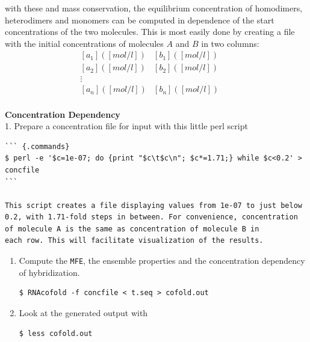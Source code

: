 \documentclass[]{article}
\providecommand{\tightlist}{%
  \setlength{\itemsep}{0pt}\setlength{\parskip}{0pt}}
\begin{document}
with these and mass conservation, the equilibrium concentration of
homodimers, heterodimers and monomers can be computed in dependence of
the start concentrations of the two molecules. This is most easily done
by creating a file with the initial concentrations of molecules \(A\) and
\(B\) in two columns:\\
 \[\begin{array}{llll}
{\left\lbrack a_{1} \right\rbrack\left( \left\lbrack mol\slash l \right\rbrack \right)} & {\left\lbrack b_{1} \right\rbrack\left( \left\lbrack mol\slash l \right\rbrack \right)} & & \\
{\left\lbrack a_{2} \right\rbrack\left( \left\lbrack mol\slash l \right\rbrack \right)} & {\left\lbrack b_{2} \right\rbrack\left( \left\lbrack mol\slash l \right\rbrack \right)} & & \\
 \vdots & & & \\
{\left\lbrack a_{n} \right\rbrack\left( \left\lbrack mol\slash l \right\rbrack \right)} & {\left\lbrack b_{n} \right\rbrack\left( \left\lbrack mol\slash l \right\rbrack \right)} & & \\
\end{array}\]

\textbf{Concentration Dependency}\\
1. Prepare a concentration file for input with this little perl script

\begin{verbatim}
``` {.commands}
$ perl -e '$c=1e-07; do {print "$c\t$c\n"; $c*=1.71;} while $c<0.2' > concfile
```

This script creates a file displaying values from 1e-07 to just below
0.2, with 1.71-fold steps in between. For convenience, concentration
of molecule A is the same as concentration of molecule B in
each row. This will facilitate visualization of the results.
\end{verbatim}

\begin{enumerate}
\def\labelenumi{\arabic{enumi}.}
\setcounter{enumi}{1}
\tightlist
\item
  Compute the \texttt{MFE}, the ensemble properties and the
  concentration dependency of hybridization.

\begin{verbatim}
$ RNAcofold -f concfile < t.seq > cofold.out
\end{verbatim}
\item
  Look at the generated output with
\begin{verbatim}
$ less cofold.out
\end{verbatim}
\end{enumerate}
\end{document}
